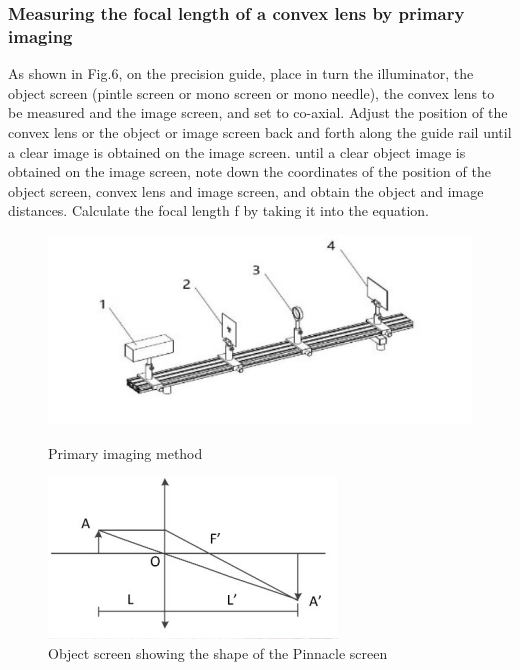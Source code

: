 \documentclass[UTF8]{article}
\begin{document}
     \subsubsection{Measuring the focal length of a convex lens by primary imaging}
     As shown in Fig.6, on the precision guide, place in turn the illuminator, the object screen (pintle screen or mono screen or mono needle), the convex lens to be measured and the image screen, and set to co-axial. Adjust the position of the convex lens or the object or image screen back and forth along the guide rail until a clear image is obtained on the image screen. until a clear object image is obtained on the image screen, note down the coordinates of the position of the object screen, convex lens and image screen, and obtain the object and image distances. Calculate the focal length f by taking it into the equation.
      \begin{figure}[H]
      			\begin{minipage}[t]{0.5\linewidth}
      				\centering
      				\includegraphics[clip,scale=0.75,trim={0 0 0 0}]{fig/fig6.png}
      				\caption{Primary imaging method}
      				\label{figure.6}
      			\end{minipage}
      			\begin{minipage}[t]{0.5\linewidth}
      				\centering
      				\includegraphics[clip,scale=1.2]{fig/fig7.png}
      				\caption{Object screen showing the shape of the Pinnacle screen}
      				\label{figure.7}
      			\end{minipage}
      		\end{figure}
\end{document}
